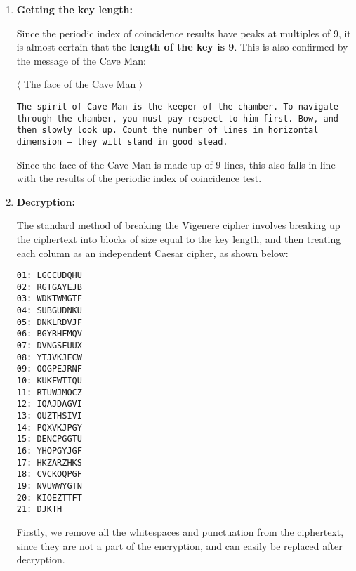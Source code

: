 \documentclass[11pt]{article}
\begin{document}
\begin{enumerate}
  \item \textbf{Getting the key length: }
  
  Since the periodic index of coincidence results have peaks at multiples of 9, it is almost certain that the \textbf{length of the key is 9}. This is also confirmed by the message of the Cave Man: 

  \bigskip

  \begin{center}
    $\langle$ The face of the Cave Man $\rangle$

  \texttt{The spirit of Cave Man is the keeper of the chamber. To navigate through the chamber, you must pay respect to him first. Bow, and then slowly look up. Count the number of lines in horizontal dimension -- they will stand in good stead.}
  \end{center}

  \bigskip

  Since the face of the Cave Man is made up of 9 lines, this also falls in line with the results of the periodic index of coincidence test.

  \item \textbf{Decryption: }
  
  The standard method of breaking the Vigenere cipher involves breaking up the ciphertext into blocks of size equal to the key length, and then treating each column as an independent Caesar cipher, as shown below:
  \bigskip

  \begin{minipage}{0.2\linewidth}
\texttt{01: LGCCUDQHU}\\
\texttt{02: RGTGAYEJB}\\
\texttt{03: WDKTWMGTF}\\
\texttt{04: SUBGUDNKU}\\
\texttt{05: DNKLRDVJF}\\
\texttt{06: BGYRHFMQV}\\
\texttt{07: DVNGSFUUX}\\
\texttt{08: YTJVKJECW}\\
\texttt{09: OOGPEJRNF}\\
\texttt{10: KUKFWTIQU}\\
\texttt{11: RTUWJMOCZ}\\
\texttt{12: IQAJDAGVI}\\
\texttt{13: OUZTHSIVI}\\
\texttt{14: PQXVKJPGY}\\
\texttt{15: DENCPGGTU}\\
\texttt{16: YHOPGYJGF}\\
\texttt{17: HKZARZHKS}\\
\texttt{18: CVCKOQPGF}\\
\texttt{19: NVUWWYGTN}\\
\texttt{20: KIOEZTTFT}\\
\texttt{21: DJKTH}
  \end{minipage}
  \begin{minipage}{0.75\linewidth}
    Firstly, we remove all the whitespaces and punctuation from the ciphertext, since they are not a part of the encryption, and can easily be replaced after decryption.
    \medskip


\end{minipage}
\end{enumerate}
\end{document}
